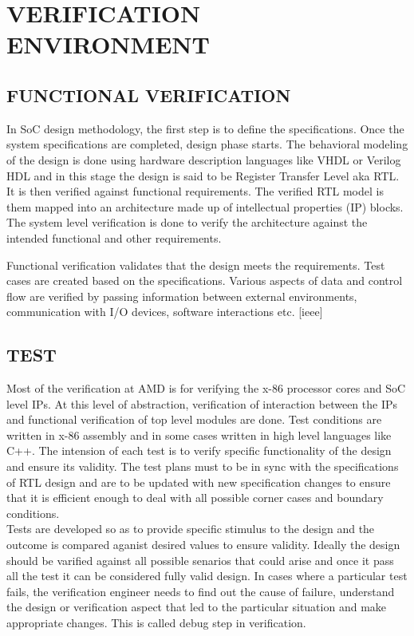 \chapter{VERIFICATION ENVIRONMENT}
\label{chap:verification.tex}

\section {FUNCTIONAL VERIFICATION}

In SoC design methodology, the first step is to define the specifications. Once the system specifications are completed, design phase starts. The behavioral modeling of the design is done using hardware description languages like VHDL or Verilog HDL and in this stage the design is said to be Register Transfer Level aka RTL. It is then verified against functional requirements.  The verified RTL model is them mapped into an architecture made up of intellectual properties (IP) blocks. The system level verification is done to verify the architecture against the intended functional and other requirements. 



Functional verification validates that the design meets the requirements. Test cases are created based on the specifications. Various aspects of data and control flow are verified by passing information between external environments, communication with I/O devices,  software interactions etc. [ieee]

 
\section {TEST}

Most of the verification at AMD is for verifying the x-86 processor cores and SoC level IPs. At this level of abstraction, verification of interaction between the IPs and functional verification of top level modules are done.  Test conditions are written in x-86 assembly and in some cases written in high level languages like C++. The intension of each test is to verify specific functionality of the design and ensure its validity. The test plans must to be in sync with the specifications of RTL design and are to be updated with new specification changes to ensure that it is efficient enough to deal with all possible corner cases and boundary conditions. \\ Tests are developed so as to provide specific stimulus to the design and the outcome is compared aganist desired values to ensure validity. Ideally the design should be varified against all possible senarios that could arise and once it pass all the test it can be considered fully valid design. In cases where a particular test fails, the verification engineer needs to find out the cause of failure, understand the design or verification aspect that led to the particular situation and make appropriate changes. This is called debug step in verification. 

